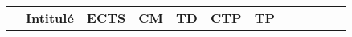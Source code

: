 


\renewcommand{\arraystretch}{1.5}%
\begin{tabular}{c|m{4.5cm}|cm{0.75cm}|cm{0.75cm}|cm{0.75cm}|cm{0.75cm}|cm{0.75cm}|}
\cline{2-7}

&
\cellcolor{couleurFonce} \color{white}\bfseries Intitul\'e & \cellcolor{couleurFonce} \color{white}\bfseries ECTS & \cellcolor{couleurFonce} \color{white}\bfseries CM & \cellcolor{couleurFonce} \color{white}\bfseries TD & \cellcolor{couleurFonce} \color{white}\bfseries CTP & \cellcolor{couleurFonce} \color{white}\bfseries TP\\ \cline{2-7}


\end{tabular}
